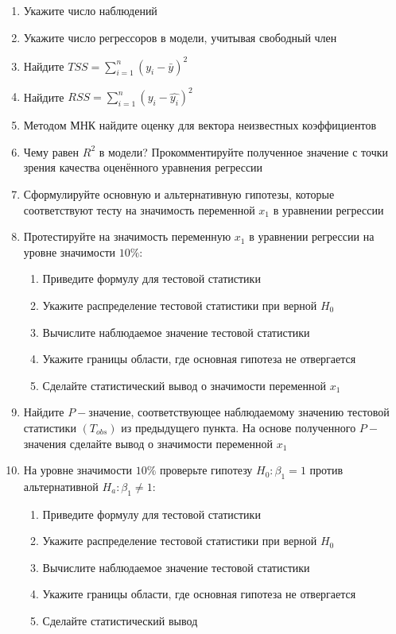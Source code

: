 \documentclass[pdftex,11pt,openany]{book}\usepackage[]{graphicx}\usepackage[]{color}
\begin{document}
\begin{problem}
\begin{enumerate}
\item Укажите число наблюдений
\item Укажите число регрессоров в модели, учитывая свободный член
\item Найдите $TSS = \sum_{i=1}^n (y_i - \bar y)^2$
\item Найдите $RSS = \sum_{i=1}^n (y_i - \hat{y_i})^2$
\item Методом МНК найдите оценку для вектора неизвестных коэффициентов
\item Чему равен $R^2$ в модели? Прокомментируйте полученное значение с точки зрения качества оценённого уравнения регрессии
\item Сформулируйте основную и альтернативную гипотезы, которые соответствуют тесту на значимость переменной $x_1$ в уравнении регрессии
\item Протестируйте на значимость переменную $x_1$ в уравнении регрессии на уровне значимости $10\%$:
\begin{enumerate}
\item Приведите формулу для тестовой статистики 
\item Укажите распределение тестовой статистики при верной $H_0$
\item Вычислите наблюдаемое значение тестовой статистики
\item Укажите границы области, где основная гипотеза не отвергается
\item Сделайте статистический вывод о значимости переменной $x_1$
\end{enumerate}
\item Найдите $P-$значение, соответствующее наблюдаемому значению тестовой статистики $(T_{obs})$ из предыдущего пункта. На основе полученного $P-$значения сделайте вывод о значимости переменной $x_1$
\item На уровне значимости $10\%$ проверьте гипотезу $H_0: \beta_1 = 1$ против альтернативной $H_a: \beta_1 \not= 1$:
\begin{enumerate}
\item Приведите формулу для тестовой статистики 
\item Укажите распределение тестовой статистики при верной $H_0$
\item Вычислите наблюдаемое значение тестовой статистики
\item Укажите границы области, где основная гипотеза не отвергается
\item Сделайте статистический вывод
\end{enumerate}

\end{enumerate}
\end{problem}
\end{document}
